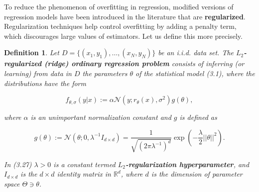 \documentclass{report}
\newtheorem{definition}{Definition}[chapter]
\begin{document}

To reduce the phenomenon of overfitting in regression, modified versions of regression models have been introduced in the literature that are \textbf{regularized}. Regularization techniques help control overfitting by adding a penalty term, which discourages large values of estimators. Let us define this more precisely.

\begin{definition}
Let $D = \{(x_1,y_1),\dots,(x_N,y_N)\}$ be an i.i.d. data set. The \textbf{$L_2$-regularized (ridge) ordinary regression problem} consists of inferring (or learning) from data in $D$ the parameters $\theta$ of the statistical model (3.1), where the distributions have the form

\begin{equation}
f_{\theta,\sigma}(y|x) := \alpha\mathcal{N}(y;r_\theta(x),\sigma^2)g(\theta),
\end{equation}

where $\alpha$ is an unimportant normalization constant and $g$ is defined as

\begin{equation}
g(\theta) := \mathcal{N}(\theta;0,\lambda^{-1}I_{d\times d}) = \frac{1}{\sqrt{(2\pi\lambda^{-1})^d}}\exp\left(-\frac{\lambda}{2}||\theta||^2\right).
\end{equation}

In (3.27) $\lambda > 0$ is a constant termed \textbf{$L_2$-regularization hyperparameter}, and $I_{d\times d}$ is the $d\times d$ identity matrix in $\mathbb{R}^d$, where $d$ is the  dimension of parameter space $\Theta \ni \theta$.
\end{definition}
\end{document}
